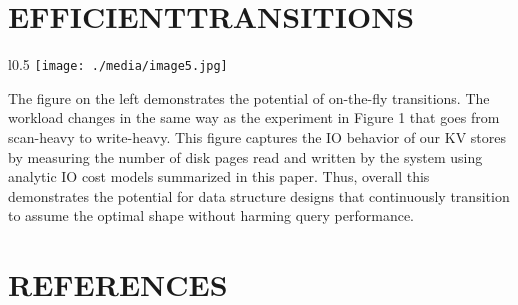 \documentclass[a4paper,12pt,notitlepage,twoside,openright]{article}
\begin{document}
\newpage
\hypertarget{efficienttransitions}{%
\section{EFFICIENTTRANSITIONS}\label{efficienttransitions}}

\begin{wrapfigure}{l}{0.5\columnwidth}
\texttt{[image: ./media/image5.jpg]}
\end{wrapfigure}The
figure on the left demonstrates the potential of on-the-fly transitions.
The workload changes in the same way as the experiment in Figure 1 that
goes from scan-heavy to write-heavy. This figure captures the IO behavior
of our KV stores by measuring the number of disk pages read and
written by the system using analytic IO cost models summarized in this
paper. Thus, overall this demonstrates the potential for data structure
designs that continuously transition to assume the optimal shape without
harming query performance.

\hypertarget{references}{%
\section{REFERENCES}\label{references}}
\end{document}
